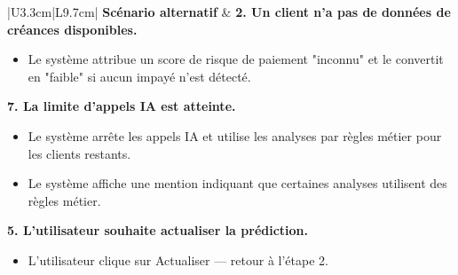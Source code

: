 \documentclass[a4paper,12pt]{report}
\begin{document}
\begin{longtable}{|U{3.3cm}|L{9.7cm}|}
\hline
\textbf{Scénario alternatif} &
\textbf{2. Un client n'a pas de données de créances disponibles.}
\begin{itemize}
    \item[2.1] Le système attribue un score de risque de paiement "inconnu" et le convertit en "faible" si aucun impayé n'est détecté.
\end{itemize}
\textbf{7. La limite d'appels IA est atteinte.}
\begin{itemize}
    \item[7.1] Le système arrête les appels IA et utilise les analyses par règles métier pour les clients restants.
    \item[7.2] Le système affiche une mention indiquant que certaines analyses utilisent des règles métier.
\end{itemize}
\textbf{5. L'utilisateur souhaite actualiser la prédiction.}
\begin{itemize}
    \item[5.1] L'utilisateur clique sur Actualiser --- retour à l'étape 2.
\end{itemize} 
\end{longtable}
\end{document}
